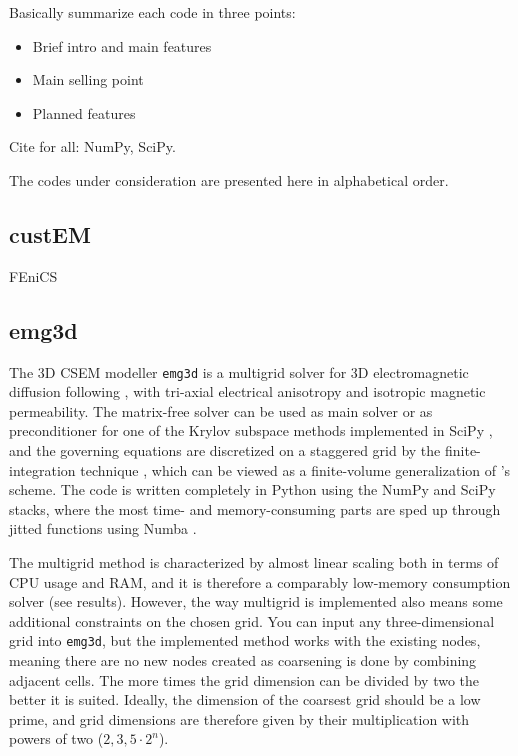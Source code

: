 \documentclass[
    paper,
  ]{geophysics}
\newcommand{\emg}[2]{\texttt{emg#1#2}\xspace}
\begin{document}
Basically summarize each code in three points:
\begin{itemize}
  \item Brief intro and main features
  \item Main selling point
  \item Planned features
\end{itemize}

Cite for all: NumPy, SciPy.

The codes under consideration are presented here in alphabetical order.

\subsection{custEM}

\cite{GEO.19.Rochlitz}

FEniCS \citep{CSE.15.Alnaes}


\subsection{emg3d}

The 3D CSEM modeller \emg3d \citep{JOSS.19.Werthmuller} is a multigrid
\citep{CMMP.64.Fedorenko} solver for 3D electromagnetic diffusion following
\cite{GP.06.Mulder}, with tri-axial electrical anisotropy and isotropic
magnetic permeability. The matrix-free solver can be used as main solver or as
preconditioner for one of the Krylov subspace methods implemented in SciPy
\citep{NM.20.Virtanen}, and the governing equations are discretized on a
staggered grid by the finite-integration technique \cite{AEU.77.Weiland}, which
can be viewed as a finite-volume generalization of \cite{IEEE.66.Yee}'s scheme.
The code is written completely in Python using the NumPy
\citep{CSE.11.VanDerWalt} and SciPy stacks, where the most time- and
memory-consuming parts are sped up through jitted functions using Numba
\citep{LLVM.15.Lam}.

The multigrid method is characterized by almost linear scaling both in terms
of CPU usage and RAM, and it is therefore a comparably low-memory consumption
solver (see results). However, the way multigrid is implemented also means some
additional constraints on the chosen grid. You can input any three-dimensional
grid into \emg3d, but the implemented method works with the existing nodes,
meaning there are no new nodes created as coarsening is done by combining
adjacent cells. The more times the grid dimension can be divided by two the
better it is suited. Ideally, the dimension of the coarsest grid should be a
low prime, and grid dimensions are therefore given by their multiplication with
powers of two (${2,3,5}·2^n$).
\end{document}
